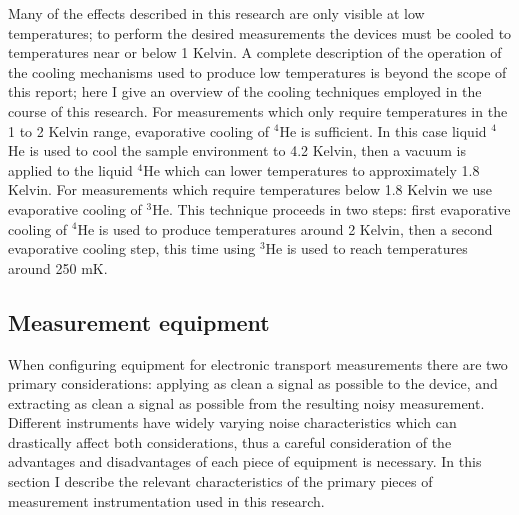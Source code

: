 \documentclass[edeposit,fullpage,draftthesis]{uiucthesis2009}
\begin{document}
        Many of the effects described in this research are only visible at low temperatures; to perform
        the desired measurements the devices must be cooled to temperatures near or below 1 Kelvin. A complete
        description of the operation of the cooling mechanisms used to produce low temperatures is beyond the scope
        of this report; here I give an overview of the cooling techniques employed in the course of this research.
        For measurements which only require temperatures in the 1 to 2 Kelvin range, evaporative cooling
        of $^4$He is sufficient. In this case liquid $^4$He is used to cool the sample environment to 4.2 Kelvin,
        then a vacuum is applied to the liquid $^4$He which can lower temperatures to approximately 1.8 Kelvin.
        For measurements which require temperatures below 1.8 Kelvin we use evaporative cooling of $^3$He. This
        technique proceeds in two steps: first evaporative cooling of $^4$He is used to produce temperatures
        around 2 Kelvin, then a second evaporative cooling step, this time using $^3$He is used to reach temperatures
        around 250 mK.
        
        
        \subsection{Measurement equipment}
        
            When configuring equipment for electronic transport measurements there are two primary considerations: 
            applying as clean a signal as possible to the device, and extracting as clean
            a signal as possible from the resulting noisy measurement. Different instruments have widely
            varying noise characteristics which can drastically affect both considerations, thus a careful
            consideration of the advantages and disadvantages of each piece of equipment is necessary.
            In this section I describe the relevant characteristics of the primary pieces of measurement
            instrumentation used in this research.
            
\end{document}
